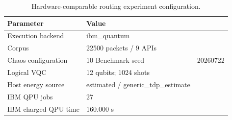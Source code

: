 \begin{table}[htbp]
\caption{Hardware-comparable routing experiment configuration.}
\label{tab:routing-experiment-configuration}
\centering
\begin{tabular}{ll}
\hline
Parameter & Value \\
\hline
Execution backend & ibm\_quantum \\
Corpus & 22500 packets / 9 APIs \\
Chaos configuration & 10%
Benchmark seed & 20260722 \\
Logical VQC & 12 qubits; 1024 shots \\
Host energy source & estimated / generic\_tdp\_estimate \\
IBM QPU jobs & 27 \\
IBM charged QPU time & 160.000 s \\
\hline
\end{tabular}
\end{table}
